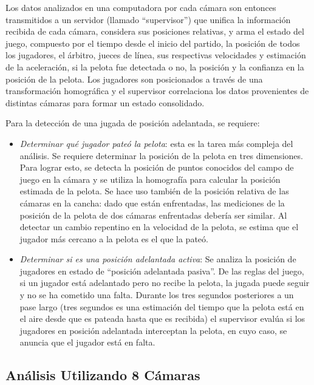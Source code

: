 Los datos analizados en una computadora por cada cámara son entonces transmitidos
a un servidor (llamado ``supervisor'') que unifica la información recibida de
cada cámara, considera sus posiciones relativas, y arma el estado del juego,
compuesto por el tiempo desde el inicio del partido, la posición de todos los
jugadores, el árbitro, jueces de línea, sus respectivas velocidades y estimación
de la aceleración, si la pelota fue detectada o no, la posición y la confianza
en la posición de la pelota. Los jugadores son posicionados a través de una
transformación homográfica y el supervisor correlaciona los datos provenientes
de distintas cámaras para formar un estado consolidado.

Para la detección de una jugada de posición adelantada, se requiere:

\begin{itemize}

  \item \textit{Determinar qué jugador pateó la pelota}: esta es la tarea más
    compleja del análisis. Se requiere determinar la posición de la pelota en
    tres dimensiones. Para lograr esto, se detecta la posición de puntos
    conocidos del campo de juego en la cámara y se utiliza la homografía para
    calcular la posición estimada de la pelota. Se hace uso también de la
    posición relativa de las cámaras en la cancha: dado que están enfrentadas,
    las mediciones de la posición de la pelota de dos cámaras enfrentadas
    debería ser similar. Al detectar un cambio repentino en la velocidad de
    la pelota, se estima que el jugador más cercano a la pelota es el que
    la pateó.

  \item \textit{Determinar si es una posición adelantada activa}: Se analiza
    la posición de jugadores en estado de ``posición adelantada pasiva''. De
    las reglas del juego, si un jugador está adelantado pero no recibe la
    pelota, la jugada puede seguir y no se ha cometido una falta. Durante los
    tres segundos posteriores a un pase largo (tres segundos es una estimación
    del tiempo que la pelota está en el aire desde que es pateada hasta que es
    recibida) el supervisor evalúa si los jugadores en posición adelantada
    interceptan la pelota, en cuyo caso, se anuncia que el jugador está en
    falta.

\end{itemize}

\subsection{Análisis Utilizando 8 Cámaras}
\label{sec:8-camaras}

